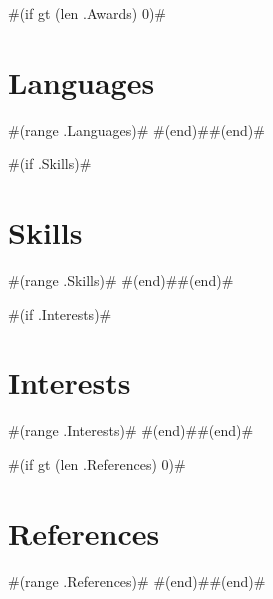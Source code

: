\documentclass[11pt,letterpaper,sans]{moderncv}        %
\begin{document}
#(if gt (len .Awards) 0)#\section{Languages}
#(range .Languages)#
#(end)##(end)#

#(if .Skills)#\section{Skills}
#(range .Skills)#
#(end)##(end)#

#(if .Interests)#\section{Interests}
#(range .Interests)#
#(end)##(end)#

#(if gt (len .References) 0)#\section{References}
#(range .References)#
#(end)##(end)#

\newpage
\nocite{*}


\end{document}

